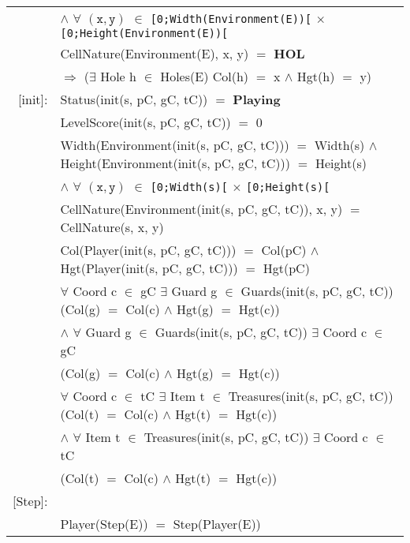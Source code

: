 \documentclass[8pt]{article}
\begin{document}
{\begin{longtable}{rl}
  & \quad\quad $\land$ $\forall$ $(\mathtt{x},\mathtt{y})$ $\in$ \texttt{[0;Width(Environment(E))[} $\times$ \texttt{[0;Height(Environment(E))[}\\
  & \quad\quad\quad\quad \textrm{CellNature(Environment(E), x, y)} $=$ \textbf{HOL}\\
  & \quad\quad\quad\quad\quad\quad $\Rightarrow$ ($\exists$ \textrm{Hole} h $\in$ \textrm{Holes(E)} \textrm{Col(h)} $=$ x $\land$ \textrm{Hgt(h)} $=$ y)\\
  \textrm{[init]}:& \textrm{Status(init(s, pC, gC, tC))} $=$ \textbf{Playing}\\
  & \textrm{LevelScore(init(s, pC, gC, tC))} $=$ 0\\
  & \textrm{Width(Environment(init(s, pC, gC, tC)))} $=$ \textrm{Width(s)} $\land$ \textrm{Height(Environment(init(s, pC, gC, tC)))} $=$ \textrm{Height(s)} \\
  & \quad\quad $\land$ $\forall$ $(\mathtt{x},\mathtt{y})$ $\in$ \texttt{[0;Width(s)[} $\times$ \texttt{[0;Height(s)[}\\
  & \quad\quad\quad\quad \textrm{CellNature(Environment(init(s, pC, gC, tC)), x, y)} $=$ \textrm{CellNature(s, x, y)}\\
  & \textrm{Col(Player(init(s, pC, gC, tC)))} $=$ \textrm{Col(pC)} $\land$ \textrm{Hgt(Player(init(s, pC, gC, tC)))} $=$ \textrm{Hgt(pC)}\\
  & $\forall$ \textrm{Coord} c $\in$ gC $\exists$ \textrm{Guard} g $\in$ \textrm{Guards(init(s, pC, gC, tC))} (\textrm{Col(g)} $=$ \textrm{Col(c)} $\land$ \textrm{Hgt(g)} $=$ \textrm{Hgt(c)})\\
  & \quad\quad $\land$ $\forall$ \textrm{Guard} g $\in$ \textrm{Guards(init(s, pC, gC, tC))} $\exists$ \textrm{Coord} c $\in$ gC\\
  & \quad\quad\quad\quad (\textrm{Col(g)} $=$ \textrm{Col(c)} $\land$ \textrm{Hgt(g)} $=$ \textrm{Hgt(c)})\\
  & $\forall$ \textrm{Coord} c $\in$ tC $\exists$ \textrm{Item} t $\in$ \textrm{Treasures(init(s, pC, gC, tC))} (\textrm{Col(t)} $=$ \textrm{Col(c)} $\land$ \textrm{Hgt(t)} $=$ \textrm{Hgt(c)})\\
  & \quad\quad $\land$ $\forall$ \textrm{Item} t $\in$ \textrm{Treasures(init(s, pC, gC, tC))} $\exists$ \textrm{Coord} c $\in$ tC\\
  & \quad\quad\quad\quad (\textrm{Col(t)} $=$ \textrm{Col(c)} $\land$ \textrm{Hgt(t)} $=$ \textrm{Hgt(c)})\\
  \textrm{[Step]}:&\\
  & \textrm{Player(Step(E))} $=$ \textrm{Step(Player(E))}\\

\end{longtable}}
\end{document}
